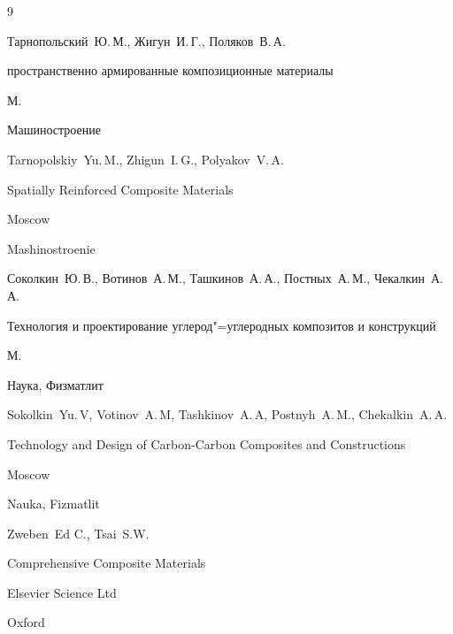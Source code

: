 \begin{thebibliography}{9}




\by Тарнопольский~Ю.\,М., Жигун~И.\,Г., Поляков~В.\,А.

\book пространственно армированные композиционные материалы

\publaddr М.

\publ Машиностроение



\misctransl

\by Tarnopolskiy~Yu.\,M., Zhigun~I.\,G., Polyakov~V.\,A.

\book Spatially Reinforced Composite Materials

\publaddr Moscow

\publ Mashino\-st\-roenie








\by Соколкин~Ю.\,В., Вотинов~А.\,М., Ташкинов~А.\,А., Постных~А.\,М., Чекалкин~А.\,А.

\book Технология и проектирование углерод"=углеродных композитов и конструкций

\publaddr М.

\publ Наука, Физматлит



\misctransl

\by Sokolkin~Yu.\,V, Votinov~A.\,M, Tashkinov~A.\,A, Postnyh~A.\,M., Chekalkin~A.\,A. 

\book Technology and Design of Carbon-Carbon Composites and Constructions



\publaddr Moscow

\publ Nauka, Fizmatlit




\by Zweben~Ed C., Tsai~S.W.

\book Comprehensive Composite Materials

\publ Elsevier Science Ltd

\publaddr Oxford


\end{thebibliography}
